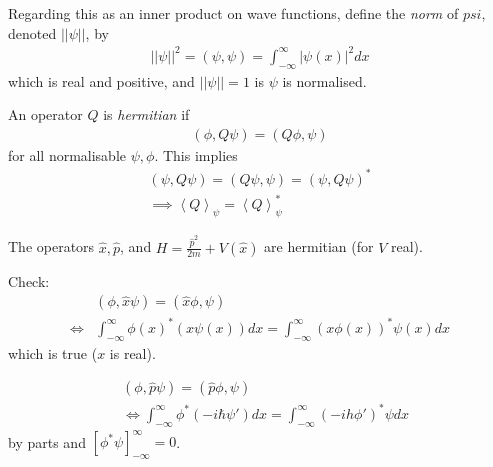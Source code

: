 \documentclass[a4paper]{article}
\begin{document}
Regarding this as an inner product on wave functions, define the \emph{norm} of $psi$, denoted $||\psi||$, by
\begin{equation*}
\begin{aligned}
||\psi||^2 = \left(\psi,\psi\right) = \int_{-\infty}^\infty |\psi\left(x\right)|^2 dx
\end{aligned}
\end{equation*}
which is real and positive, and $||\psi|| = 1$ is $\psi$ is normalised.

An operator $Q$ is \emph{hermitian} if
\begin{equation*}
\begin{aligned}
\left(\phi,Q\psi\right) = \left(Q\phi,\psi\right)
\end{aligned}
\end{equation*}
for all normalisable $\psi,\phi$. This implies
\begin{equation*}
\begin{aligned}
\left(\psi,Q\psi\right) = \left(Q\psi,\psi\right) = \left(\psi,Q\psi\right)^*\\
\implies \left<Q\right>_\psi = \left<Q\right>_\psi^*
\end{aligned}
\end{equation*}

The operators $\hat{x},\hat{p}$, and $H=\frac{\hat{p}^2}{2m} + V\left(\hat{x}\right)$ are hermitian (for $V$ real).

Check:
\begin{equation*}
\begin{aligned}
&\left(\phi,\hat{x}\psi\right) = \left(\hat{x}\phi,\psi\right)\\
\iff & \int_{-\infty}^\infty \phi\left(x\right)^* \left(x\psi\left(x\right)\right)dx = \int_{-\infty}^\infty \left(x\phi\left(x\right)\right)^* \psi\left(x\right) dx
\end{aligned}
\end{equation*}
which is true ($x$ is real).

\begin{equation*}
\begin{aligned}
&\left(\phi,\hat{p}\psi\right) = \left(\hat{p}\phi,\psi\right)\\
&\iff \int_{-\infty}^\infty \phi^* \left(-i\hbar \psi'\right) dx = \int_{-\infty}^\infty \left(-ih\phi'\right)^* \psi dx
\end{aligned}
\end{equation*}
by parts and $\left[\phi^*\psi\right]_{-\infty}^\infty = 0$.
\end{document}
